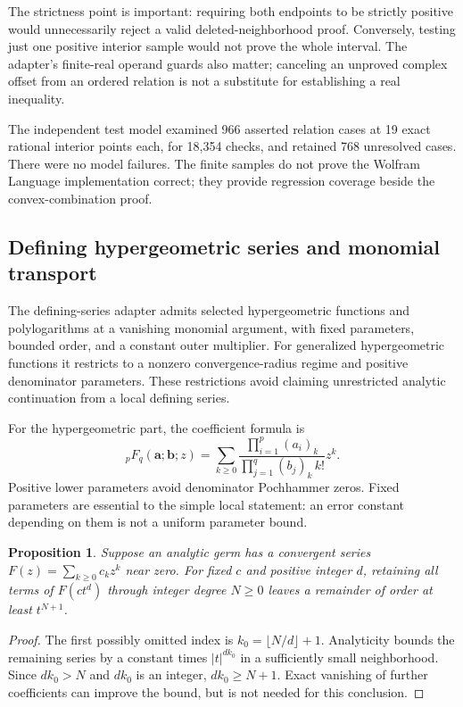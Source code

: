 \documentclass[11pt,letterpaper]{article}
\newtheorem{proposition}{Proposition}
\begin{document}
The strictness point is important: requiring both endpoints to be strictly positive would unnecessarily reject a valid deleted-neighborhood proof. Conversely, testing just one positive interior sample would not prove the whole interval. The adapter's finite-real operand guards also matter; canceling an unproved complex offset from an ordered relation is not a substitute for establishing a real inequality.~\cite{mbranches,massumptions}

The independent test model examined 966 asserted relation cases at 19 exact rational interior points each, for 18,354 checks, and retained 768 unresolved cases. There were no model failures. The finite samples do not prove the Wolfram Language implementation correct; they provide regression coverage beside the convex-combination proof.

\subsection{Defining hypergeometric series and monomial transport}

The defining-series adapter admits selected hypergeometric functions and polylogarithms at a vanishing monomial argument, with fixed parameters, bounded order, and a constant outer multiplier. For generalized hypergeometric functions it restricts to a nonzero convergence-radius regime and positive denominator parameters. These restrictions avoid claiming unrestricted analytic continuation from a local defining series.~\cite{mtaylor,dlmf16}

For the hypergeometric part, the coefficient formula is
\begin{equation}
 {}_pF_q(\boldsymbol a;\boldsymbol b;z)
 =\sum_{k\geq0}
 \frac{\prod_{i=1}^{p}(a_i)_k}
      {\prod_{j=1}^{q}(b_j)_k\,k!}z^k.
 \label{eq:hypergeom}
\end{equation}
Positive lower parameters avoid denominator Pochhammer zeros. Fixed parameters are essential to the simple local statement: an error constant depending on them is not a uniform parameter bound.~\cite{dlmf16}

\begin{proposition}
Suppose an analytic germ has a convergent series $F(z)=\sum_{k\geq0}c_kz^k$ near zero. For fixed $c$ and positive integer $d$, retaining all terms of $F(c t^d)$ through integer degree $N\geq0$ leaves a remainder of order at least $t^{N+1}$.
\end{proposition}
\begin{proof}
The first possibly omitted index is $k_0=\lfloor N/d\rfloor+1$. Analyticity bounds the remaining series by a constant times $|t|^{dk_0}$ in a sufficiently small neighborhood. Since $dk_0>N$ and $dk_0$ is an integer, $dk_0\geq N+1$. Exact vanishing of further coefficients can improve the bound, but is not needed for this conclusion.
\end{proof}
\end{document}
